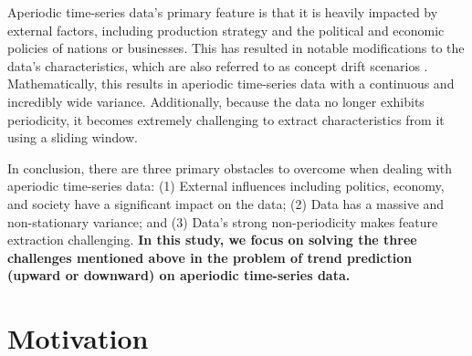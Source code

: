 Aperiodic time-series data's primary feature is that it is heavily impacted by external factors, including production strategy and the political and economic policies of nations or businesses. This has resulted in notable modifications to the data's characteristics, which are also referred to as concept drift scenarios \cite{liu2025onsitnet}. Mathematically, this results in aperiodic time-series data with a continuous and incredibly wide variance. Additionally, because the data no longer exhibits periodicity, it becomes extremely challenging to extract characteristics from it using a sliding window.


In conclusion, there are three primary obstacles to overcome when dealing with aperiodic time-series data: (1) External influences including politics, economy, and society have a significant impact on the data; (2) Data has a massive and non-stationary variance; and (3) Data's strong non-periodicity makes feature extraction challenging. \textbf{In this study, we focus on solving the three challenges mentioned above in the problem of trend prediction (upward or downward) on aperiodic time-series data.}

\section{Motivation}


